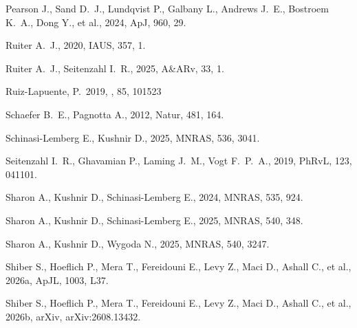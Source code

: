 \documentclass[twocolumn]{aastex701}
\begin{document}
\begin{thebibliography}{}
 Pearson J., Sand D.~J., Lundqvist P., Galbany L., Andrews J.~E., Bostroem K.~A., Dong Y., et al., 2024, ApJ, 960, 29. 

 Ruiter A.~J., 2020, IAUS, 357, 1. 

 Ruiter A.~J., Seitenzahl I.~R., 2025, A\&ARv, 33, 1. 


 Ruiz-Lapuente, P.\ 2019, \nar, 85, 101523

 Schaefer B.~E., Pagnotta A., 2012, Natur, 481, 164. 

 Schinasi-Lemberg E., Kushnir D., 2025, MNRAS, 536, 3041. 



 Seitenzahl I.~R., Ghavamian P., Laming J.~M., Vogt F.~P.~A., 2019, PhRvL, 123, 041101. 
  
 Sharon A., Kushnir D., Schinasi-Lemberg E., 2024, MNRAS, 535, 924. 

 Sharon A., Kushnir D., Schinasi-Lemberg E., 2025, MNRAS, 540, 348. 

 Sharon A., Kushnir D., Wygoda N., 2025, MNRAS, 540, 3247. 

 Shiber S., Hoeflich P., Mera T., Fereidouni E., Levy Z., Maci D., Ashall C., et al., 2026a, ApJL, 1003, L37. 

 Shiber S., Hoeflich P., Mera T., Fereidouni E., Levy Z., Maci D., Ashall C., et al., 2026b, arXiv, arXiv:2608.13432. 


\end{thebibliography}
\end{document}
